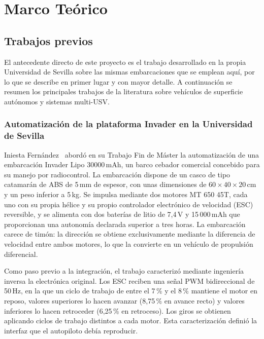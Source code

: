 \chapter{Marco Teórico}
\label{ch:marco}


\section{Trabajos previos}
\label{sec:trabajos_previos}
 
El antecedente directo de este proyecto es el trabajo desarrollado en la propia
Universidad de Sevilla sobre las mismas embarcaciones que se emplean aquí, por lo que
se describe en primer lugar y con mayor detalle. A continuación se resumen los
principales trabajos de la literatura sobre vehículos de superficie autónomos y
sistemas multi-USV.
 
\subsection{Automatización de la plataforma Invader en la Universidad de Sevilla}
\label{subsec:invader}
 
Iniesta Fernández~\cite{iniesta2025} abordó en su Trabajo Fin de Máster la
automatización de una embarcación Invader Lipo 30000\,mAh, un barco cebador comercial
concebido para su manejo por radiocontrol. La embarcación dispone de un casco de tipo
catamarán de ABS de 5\,mm de espesor, con unas dimensiones de
$60 \times 40 \times 20$\,cm y un peso inferior a 5\,kg. Se impulsa mediante dos
motores MT 650 45T, cada uno con su propia hélice y su propio controlador electrónico
de velocidad (ESC) reversible, y se alimenta con dos baterías de litio de 7,4\,V y
15\,000\,mAh que proporcionan una autonomía declarada superior a tres horas. La
embarcación carece de timón: la dirección se obtiene exclusivamente mediante la
diferencia de velocidad entre ambos motores, lo que la convierte en un vehículo de
propulsión diferencial.
 
Como paso previo a la integración, el trabajo caracterizó mediante ingeniería inversa
la electrónica original. Los ESC reciben una señal PWM bidireccional de 50\,Hz, en la
que un ciclo de trabajo de entre el 7\,\% y el 8\,\% mantiene el motor en reposo,
valores superiores lo hacen avanzar (8,75\,\% en avance recto) y valores inferiores lo
hacen retroceder (6,25\,\% en retroceso). Los giros se obtienen aplicando ciclos de
trabajo distintos a cada motor. Esta caracterización definió la interfaz que el
autopiloto debía reproducir.
 
